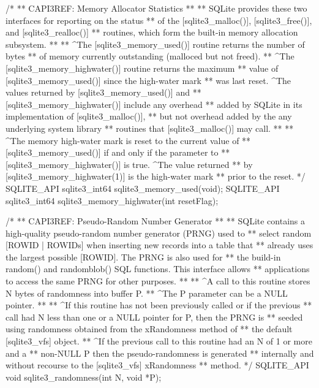 \begin{Codex}[label=sqlite3.h,numbers=left]
{/*
** CAPI3REF: Memory Allocator Statistics
**
** SQLite provides these two interfaces for reporting on the status
** of the [sqlite3_malloc()], [sqlite3_free()], and [sqlite3_realloc()]
** routines, which form the built-in memory allocation subsystem.
**
** ^The [sqlite3_memory_used()] routine returns the number of bytes
** of memory currently outstanding (malloced but not freed).
** ^The [sqlite3_memory_highwater()] routine returns the maximum
** value of [sqlite3_memory_used()] since the high-water mark
** was last reset.  ^The values returned by [sqlite3_memory_used()] and
** [sqlite3_memory_highwater()] include any overhead
** added by SQLite in its implementation of [sqlite3_malloc()],
** but not overhead added by the any underlying system library
** routines that [sqlite3_malloc()] may call.
**
** ^The memory high-water mark is reset to the current value of
** [sqlite3_memory_used()] if and only if the parameter to
** [sqlite3_memory_highwater()] is true.  ^The value returned
** by [sqlite3_memory_highwater(1)] is the high-water mark
** prior to the reset.
*/
SQLITE_API sqlite3_int64 sqlite3_memory_used(void);
SQLITE_API sqlite3_int64 sqlite3_memory_highwater(int resetFlag);

/*
** CAPI3REF: Pseudo-Random Number Generator
**
** SQLite contains a high-quality pseudo-random number generator (PRNG) used to
** select random [ROWID | ROWIDs] when inserting new records into a table that
** already uses the largest possible [ROWID].  The PRNG is also used for
** the build-in random() and randomblob() SQL functions.  This interface allows
** applications to access the same PRNG for other purposes.
**
** ^A call to this routine stores N bytes of randomness into buffer P.
** ^The P parameter can be a NULL pointer.
**
** ^If this routine has not been previously called or if the previous
** call had N less than one or a NULL pointer for P, then the PRNG is
** seeded using randomness obtained from the xRandomness method of
** the default [sqlite3_vfs] object.
** ^If the previous call to this routine had an N of 1 or more and a
** non-NULL P then the pseudo-randomness is generated
** internally and without recourse to the [sqlite3_vfs] xRandomness
** method.
*/
SQLITE_API void sqlite3_randomness(int N, void *P);

}
\end{Codex}
